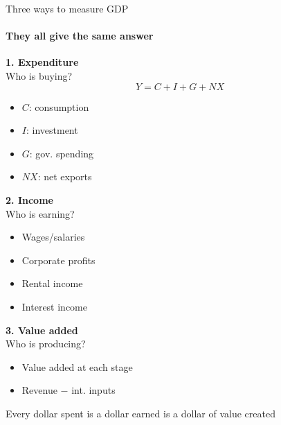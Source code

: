 \documentclass[aspectratio=169]{beamer}
\begin{document}
\begin{frame}[t]{Three ways to measure GDP}
   \framesubtitle{They all give the same answer}

   \small
   \noindent%
   \begin{minipage}[t]{0.33\textwidth}
      \textbf{\textcolor{HECnavy}{1. Expenditure}}\\[4pt]
      Who is buying?
      \vspace{-0.2cm}
      \begin{equation*}
         Y = C + I + G + NX
      \end{equation*}
      \vspace{-0.8cm}
      \begin{itemize}
         \footnotesize
         \item $C$: consumption
         \item $I$: investment
         \item $G$: gov. spending
         \item $NX$: net exports
      \end{itemize}
   \end{minipage}%
   \begin{minipage}[t]{0.33\textwidth}
      \textbf{\textcolor{HECnavy}{2. Income}}\\[4pt]
      Who is earning?
      \vspace{0.1cm}
      \begin{itemize}
         \footnotesize
         \item Wages/salaries
         \item Corporate profits
         \item Rental income
         \item Interest income
      \end{itemize}
   \end{minipage}%
   \hspace{-0.5cm}
   \begin{minipage}[t]{0.33\textwidth}
      \textbf{\textcolor{HECnavy}{3. Value added}}\\[4pt]
      Who is producing?
      \vspace{0.1cm}
      \begin{itemize}
         \footnotesize
         \item Value added at each stage
         \item Revenue $-$ int. inputs
      \end{itemize}
   \end{minipage}
   \vspace{0.1cm}
   \begin{keyinsight}
      Every dollar spent is a dollar earned is a dollar of value created
   \end{keyinsight}
\end{frame}
\end{document}
